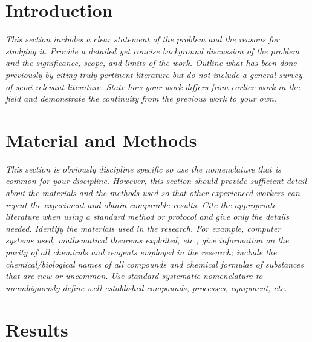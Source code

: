 \documentclass[12pt, a4paper, oneside]{report}
\newcommand{\instructions}[1]{{\color{orange}\itshape #1}}
\begin{document}

\clearpage
{}


\chapter{Introduction}
\label{introduction}

\instructions{This section includes a clear statement of the problem and the reasons for studying it. Provide a detailed yet concise background discussion of the problem and the significance, scope, and limits of the work. Outline what has been done previously by citing truly pertinent literature but do not include a general survey of semi-relevant literature. State how your work differs from earlier work in the field and demonstrate the continuity from the previous work to your own.}


\chapter{Material and Methods}
\label{material-and-methods}

\instructions{This section is obviously discipline specific so use the nomenclature that is common for your discipline. However, this section should provide sufficient detail about the materials and the methods used so that other experienced workers can repeat the experiment and obtain comparable results. Cite the appropriate literature when using a standard method or protocol and give only the details needed. Identify the materials used in the research. For example, computer systems used, mathematical theorems exploited, etc.; give information on the purity of all chemicals and reagents employed in the research; include the chemical/biological names of all compounds and chemical formulas of substances that are new or uncommon. Use standard systematic nomenclature to unambiguously define well-established compounds, processes, equipment, etc.}


\chapter{Results}
\label{results}
\end{document}
